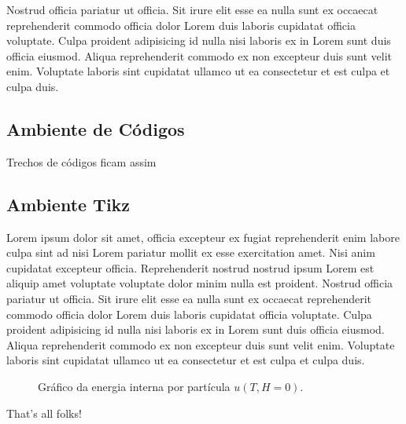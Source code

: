 Nostrud officia pariatur ut officia. Sit irure elit esse ea nulla sunt ex occaecat reprehenderit commodo officia dolor Lorem duis laboris cupidatat officia voluptate. Culpa proident adipisicing id nulla nisi laboris ex in Lorem sunt duis officia eiusmod. Aliqua reprehenderit commodo ex non excepteur duis sunt velit enim. Voluptate laboris sint cupidatat ullamco ut ea consectetur et est culpa et culpa duis.
\subsection{Ambiente de Códigos} %
\label{sub:Ambiente de Códigos}
Trechos de códigos ficam assim


\subsection{Ambiente Tikz} %
\label{sub:Ambiente Tikz}
Lorem ipsum dolor sit amet, officia excepteur ex fugiat reprehenderit enim labore culpa sint ad nisi Lorem pariatur mollit ex esse exercitation amet. Nisi anim cupidatat excepteur officia. Reprehenderit nostrud nostrud ipsum Lorem est aliquip amet voluptate voluptate dolor minim nulla est proident. Nostrud officia pariatur ut officia. Sit irure elit esse ea nulla sunt ex occaecat reprehenderit commodo officia dolor Lorem duis laboris cupidatat officia voluptate. Culpa proident adipisicing id nulla nisi laboris ex in Lorem sunt duis officia eiusmod. Aliqua reprehenderit commodo ex non excepteur duis sunt velit enim. Voluptate laboris sint cupidatat ullamco ut ea consectetur et est culpa et culpa duis.

\begin{figure}[!ht]        
  \begin{center}
	 
  \end{center}        
	 \caption{Gráfico da energia interna por partícula $u(T,H=0).$}
	 \label{fig:plot-prob2a}       
  \end{figure}

  That's all folks!
